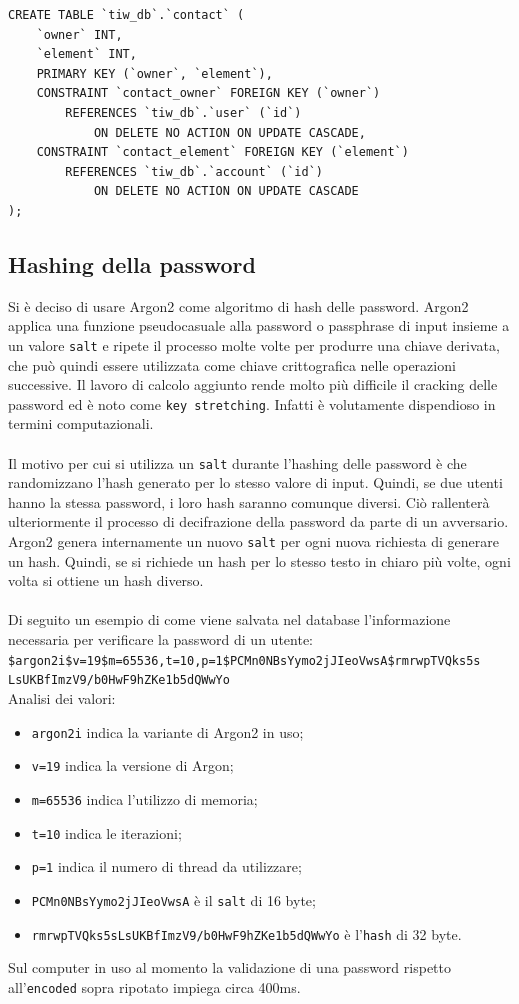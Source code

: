 \documentclass{article}
\begin{document}
\begin{verbatim}
CREATE TABLE `tiw_db`.`contact` (
	`owner` INT,
	`element` INT,
	PRIMARY KEY (`owner`, `element`),
	CONSTRAINT `contact_owner` FOREIGN KEY (`owner`) 
		REFERENCES `tiw_db`.`user` (`id`)
			ON DELETE NO ACTION ON UPDATE CASCADE,
	CONSTRAINT `contact_element` FOREIGN KEY (`element`) 
		REFERENCES `tiw_db`.`account` (`id`) 
			ON DELETE NO ACTION ON UPDATE CASCADE
);
\end{verbatim}

\subsection{Hashing della password}
Si è deciso di usare Argon2 come algoritmo di hash delle password. Argon2 applica una funzione pseudocasuale alla password o passphrase di input insieme a un valore \texttt{salt} e ripete il processo molte volte per produrre una chiave derivata, che può quindi essere utilizzata come chiave crittografica nelle operazioni successive. Il lavoro di calcolo aggiunto rende molto più difficile il cracking delle password ed è noto come \texttt{key stretching}. Infatti è volutamente dispendioso in termini computazionali.
\\\\
Il motivo per cui si utilizza un \texttt{salt} durante l'hashing delle password è che randomizzano l'hash generato per lo stesso valore di input. Quindi, se due utenti hanno la stessa password, i loro hash saranno comunque diversi. Ciò rallenterà ulteriormente il processo di decifrazione della password da parte di un avversario.
\\
Argon2 genera internamente un nuovo \texttt{salt} per ogni nuova richiesta di generare un hash. Quindi, se si richiede un hash per lo stesso testo in chiaro più volte, ogni volta si ottiene un hash diverso. 
\\ \\
Di seguito un esempio di come viene salvata nel database l'informazione necessaria per verificare la password di un utente:\\ \texttt{\$argon2i\$v=19\$m=65536,t=10,p=1\$PCMn0NBsYymo2jJIeoVwsA\$rmrwpTVQks5s\\LsUKBfImzV9/b0HwF9hZKe1b5dQWwYo}
\\
Analisi dei valori:
\begin{itemize}
	\item \texttt{argon2i} indica la  variante di Argon2 in uso;
	\item \texttt{v=19} indica la versione di Argon;
	\item \texttt{m=65536} indica l'utilizzo di memoria;
	\item \texttt{t=10} indica le iterazioni;
	\item \texttt{p=1} indica il numero di thread da utilizzare;
	\item \texttt{PCMn0NBsYymo2jJIeoVwsA} è il \texttt{salt} di 16 byte;
	\item \texttt{rmrwpTVQks5sLsUKBfImzV9/b0HwF9hZKe1b5dQWwYo} è l'\texttt{hash} di 32 byte.
\end{itemize}
Sul computer in uso al momento la validazione di una password rispetto all'\texttt{encoded} sopra ripotato impiega circa 400ms. 
\end{document}
